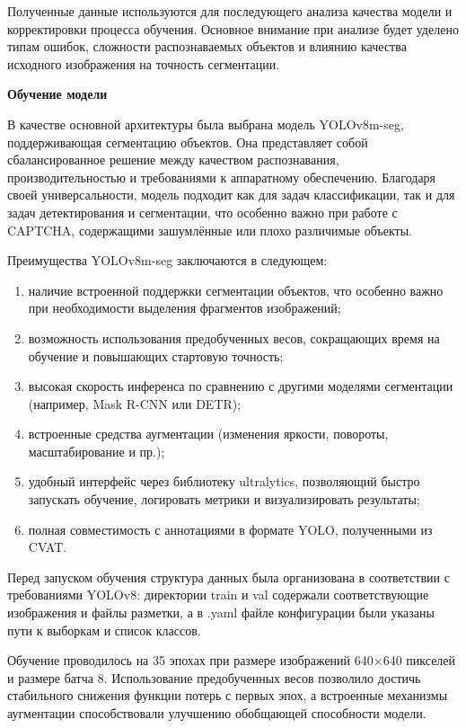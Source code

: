 Полученные данные используются для последующего анализа качества модели и 
корректировки процесса обучения. Основное внимание при анализе будет уделено 
типам ошибок, сложности распознаваемых объектов и влиянию качества исходного 
изображения на точность сегментации.

\textbf{Обучение модели}

В качестве основной архитектуры была выбрана модель YOLOv8m-seg, поддерживающая 
сегментацию объектов. Она представляет собой сбалансированное решение между 
качеством распознавания, производительностью и требованиями к аппаратному 
обеспечению. Благодаря своей универсальности, модель подходит как для задач 
классификации, так и для задач детектирования и сегментации, что особенно важно 
при работе с CAPTCHA, содержащими зашумлённые или плохо различимые объекты.

Преимущества YOLOv8m-seg заключаются в следующем:

\begin{enumerate}
    \item наличие встроенной поддержки сегментации объектов, что особенно важно 
    при необходимости выделения фрагментов изображений;
    \item возможность использования предобученных весов, сокращающих время на 
    обучение и повышающих стартовую точность;
    \item высокая скорость инференса по сравнению с другими моделями сегментации 
    (например, Mask R-CNN или DETR);
    \item встроенные средства аугментации (изменения яркости, повороты, 
    масштабирование и пр.);
    \item удобный интерфейс через библиотеку ultralytics, позволяющий быстро 
    запускать обучение, логировать метрики и визуализировать результаты;
    \item полная совместимость с аннотациями в формате YOLO, полученными из CVAT.
\end{enumerate}

Перед запуском обучения структура данных была организована в соответствии с 
требованиями YOLOv8: директории train и val содержали соответствующие изображения 
и файлы разметки, а в .yaml файле конфигурации были указаны пути к выборкам и 
список классов.

Обучение проводилось на 35 эпохах при размере изображений 640×640 пикселей и 
размере батча 8. Использование предобученных весов позволило достичь стабильного 
снижения функции потерь с первых эпох, а встроенные механизмы аугментации 
способствовали улучшению обобщающей способности модели.

